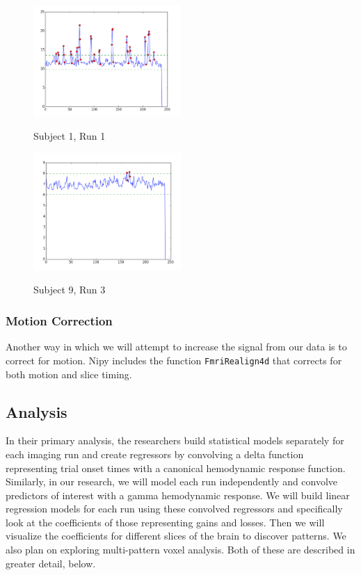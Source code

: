\documentclass[11pt]{article}
\begin{document}
\begin{figure}[h]
\caption{Subject 1, Run 1}
\centering
\includegraphics[width=0.5\textwidth]{outliers-1-1.png}
\label{fig:outliers-1-1}
\end{figure}

\begin{figure}[h]
\caption{Subject 9, Run 3}
\centering
\includegraphics[width=0.5\textwidth]{outliers-9-3.png}
\label{fig:outliers-9-3}
\end{figure}

\subsubsection{Motion Correction}

Another way in which we will attempt to increase the signal from our data is to
correct for motion. Nipy includes the function \texttt{FmriRealign4d} that
corrects for both motion and slice timing.

\subsection{Analysis}

In their primary analysis, the researchers build statistical models separately
for each imaging run and create regressors by convolving a delta function
representing trial onset times with a canonical hemodynamic response function.
Similarly, in our research, we will model each run independently and convolve
predictors of interest with a gamma hemodynamic response. We will build linear
regression models for each run using these convolved regressors and
specifically look at the coefficients of those representing gains and losses.
Then we will visualize the coefficients for different slices of the brain to
discover patterns. We also plan on exploring multi-pattern voxel analysis. Both
of these are described in greater detail, below.
\end{document}
